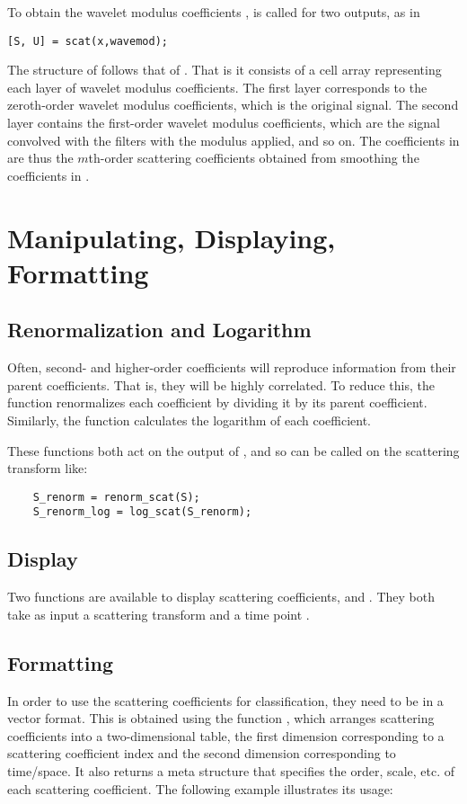 \documentclass[twocolumn]{article}
\begin{document}
To obtain the wavelet modulus coefficients ,  is called for two outputs, as in
\begin{lstlisting}
[S, U] = scat(x,wavemod);
\end{lstlisting}
The structure of  follows that of . That is it consists of a cell array representing each layer of wavelet modulus coefficients. The first layer 
corresponds to the zeroth-order wavelet modulus coefficients, which is the original signal. The second layer contains the first-order wavelet modulus coefficients, 
which are the signal convolved with the filters with the modulus applied, and so on. The coefficients in  are thus the $m$th-order scattering 
coefficients obtained from smoothing the coefficients in .

\section{Manipulating, Displaying, Formatting}

\subsection{Renormalization and Logarithm}
Often, second- and higher-order coefficients will reproduce information from their parent coefficients. That is, they will be highly correlated. To reduce this, 
the  function renormalizes each coefficient by dividing it by its parent coefficient. Similarly, the  function calculates 
the logarithm of each coefficient.

These functions both act on the output of , and so can be called on the scattering transform  like:
\begin{lstlisting}
	S_renorm = renorm_scat(S);
	S_renorm_log = log_scat(S_renorm);
\end{lstlisting}

\subsection{Display}
Two functions are available to display scattering coefficients,  and . They both take as input a scattering transform  and a time point .

\subsection{Formatting}
In order to use the scattering coefficients for classification, they need to be in a vector format. This is obtained using the function , which 
arranges scattering coefficients into a two-dimensional table, the first dimension corresponding to a scattering coefficient index and the second dimension corresponding 
to time/space. It also returns a meta structure that specifies the order, scale, etc. of each scattering coefficient. The following example illustrates its usage:
\end{document}
